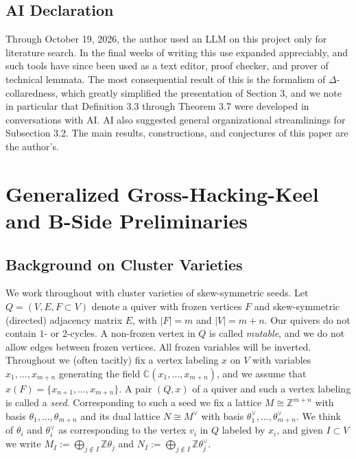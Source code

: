 \documentclass[11pt]{amsart}
\theoremstyle{definition}
\theoremstyle{remark}
\numberwithin{equation}{section}
\begin{document}
\subsection{AI Declaration}
Through October 19, 2026, the author used an LLM on this project only for literature search. In the final weeks of writing this use expanded appreciably, and such tools have since been used as a text editor, proof checker, and prover of technical lemmata. The most consequential result of this is the formalism of $\Delta$-collaredness, which greatly simplified the presentation of Section 3, and we note in particular that Definition 3.3 through Theorem 3.7 were developed in conversations with AI. AI also suggested general organizational streamlinings for Subsection 3.2. The main results, constructions, and conjectures of this paper are the author’s.

\section{Generalized Gross-Hacking-Keel and B-Side Preliminaries}

\subsection{Background on Cluster Varieties}

We work throughout with cluster varieties of skew-symmetric seeds. Let $Q = (V, E, F \subset V)$ denote a quiver with frozen vertices $F$ and skew-symmetric (directed) adjacency matrix $E$, with $|F| = m$ and $|V| = m + n$. Our quivers do not contain $1$- or $2$-cycles. A non-frozen vertex in $Q$ is called \textit{mutable}, and we do not allow edges between frozen vertices. All frozen variables will be inverted.\\

Throughout we (often tacitly) fix a vertex labeling $x$ on $V$ with variables $x_1, ..., x_{m + n}$ generating the field $\mathbb C(x_1,\dots,x_{m+n})$, and we assume that $x(F) = \{x_{n + 1}, ..., x_{m + n}\}$. A pair $(Q, x)$ of a quiver and such a vertex labeling is called a \textit{seed}. Corresponding to such a seed we fix a lattice $M \cong \mathbb{Z}^{m+n}$ with basis $\theta_1, ..., \theta_{m+n}$ and its dual lattice $N \cong M^\vee$ with basis $\theta_1^\vee, ..., \theta_{m+n}^\vee$. We think of $\theta_i$ and $\theta_i^\vee$ as corresponding to the vertex $v_i$ in $Q$ labeled by $x_i$, and given $I \subset V$ we write $M_I :=\bigoplus_{j \notin I} \mathbb{Z} \theta_j$ and $N_I:=\bigoplus_{j\notin I} \mathbb{Z} \theta^\vee_j$.\\
\end{document}
